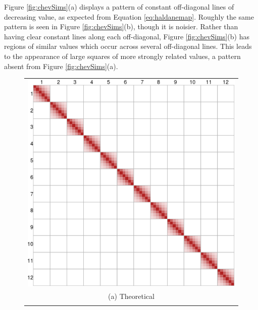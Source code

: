 \documentclass[sts]{imsart}
\begin{document}
Figure \ref{fig:chevSims}(a) displays a pattern of constant off-diagonal lines of decreasing value, as expected from Equation \ref{eq:haldanemap}. Roughly the same pattern is seen in Figure \ref{fig:chevSims}(b), though it is noisier. Rather than having clear constant lines along each off-diagonal, Figure \ref{fig:chevSims}(b) has regions of similar values which occur across several off-diagonal lines. This leads to the appearance of large squares of more strongly related values, a pattern absent from Figure \ref{fig:chevSims}(a).

\begin{figure}[h!]
  \begin{center}
    \begin{tabular}{c}
      \includegraphics[scale=0.35]{../img/LBSimTheory.png} \\
      {\footnotesize (a) Theoretical} \\
      \\

\end{tabular}
\end{center}
\end{figure}
\end{document}
